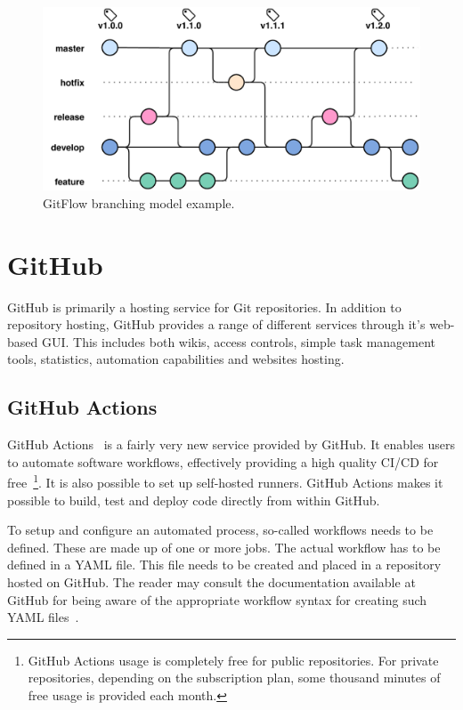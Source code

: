 \begin{figure}[ht]
    \centering
    \includegraphics[page=1,width=\textwidth]{sections/theory/figures/gitflow.pdf}
    \caption{GitFlow branching model example.}
    \label{fig:gitflow}
\end{figure}

\section{GitHub}
GitHub is primarily a hosting service for Git repositories. In addition to repository hosting, GitHub provides a range of different services through it's web-based GUI. This includes both wikis, access controls, simple task management tools, statistics, automation capabilities and websites hosting.

\subsection{GitHub Actions}
\label{sec:theory-github-actions}
GitHub Actions~\cite{github-actions} is a fairly very new service provided by GitHub. It enables users to automate software workflows, effectively providing a high quality CI/CD for free~\footnote{GitHub Actions usage is completely free for public repositories. For private repositories, depending on the subscription plan, some thousand minutes of free usage is provided each month.}. It is also possible to set up self-hosted runners. GitHub Actions makes it possible to build, test and deploy code directly from within GitHub.

To setup and configure an automated process, so-called workflows needs to be defined. These are made up of one or more jobs. The actual workflow has to be defined in a YAML file. This file needs to be created and placed in a repository hosted on GitHub. The reader may consult the documentation available at GitHub for being aware of the appropriate workflow syntax for creating such YAML files~\cite{github-actions-workflow-syntax}.

